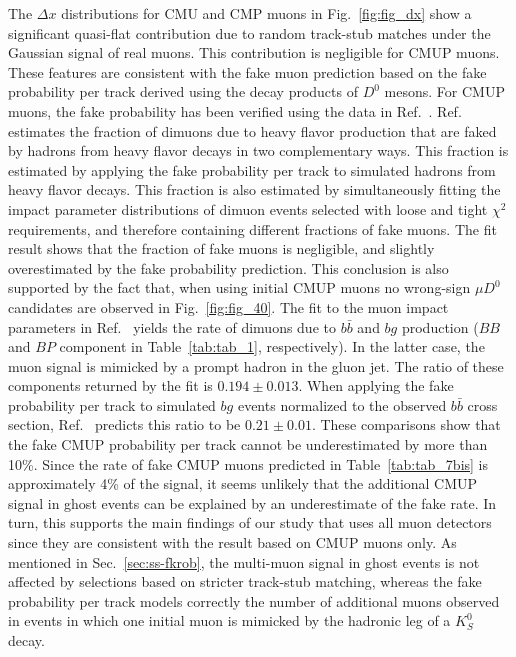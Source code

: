 \documentclass[aps,prd,preprint,floatfix,nofootinbib,superscriptaddress,showpacs,amssymb]{revtex4}
\begin{document}
 The $\Delta x$ distributions for CMU and CMP muons in 
 Fig.~\ref{fig:fig_dx} show a significant quasi-flat contribution due
 to random track-stub matches under the Gaussian signal of real muons.
 This contribution is negligible for CMUP muons. These features are
 consistent with the fake muon prediction based on the fake probability
 per track derived using the decay products of $D^0$ mesons. For CMUP muons,
 the fake probability has been verified using the data in Ref.~\cite{bbxs}. 
 Ref.~\cite{bbxs} estimates the fraction of dimuons due to heavy flavor
 production that are faked by hadrons from heavy flavor decays in two
 complementary ways. This fraction is estimated by applying the fake
 probability per track to simulated hadrons from heavy flavor decays. 
 This fraction is also estimated by simultaneously fitting the impact
 parameter distributions of dimuon events selected with loose and tight
 $\chi^2$ requirements, and therefore containing different fractions of
 fake muons. The fit result shows that the fraction of fake muons is
 negligible, and slightly overestimated by the fake probability prediction.
 This conclusion is also supported by the fact that, when using initial
 CMUP muons no wrong-sign $\mu D^0$ candidates are observed in
 Fig.~\ref{fig:fig_40}. The fit to the muon impact parameters in
 Ref.~\cite{bbxs} yields the rate of dimuons due to $b\bar{b}$ and
 $b g$ production ($BB$ and $BP$ component in Table~\ref{tab:tab_1},
 respectively). In the latter case, the muon signal is mimicked by a
 prompt hadron in the gluon jet. The ratio of these components returned
 by the fit is $0.194 \pm 0.013$. When applying the fake probability per
 track to simulated $b g$ events normalized to the observed $b \bar{b}$ 
 cross section, Ref.~\cite{bbxs} predicts this ratio to be $0.21 \pm 0.01$.
 These comparisons show that the fake CMUP probability per track cannot be
 underestimated by more than 10\%. Since the rate of fake CMUP muons
 predicted in Table~\ref{tab:tab_7bis} is approximately 4\% of the signal,
 it seems unlikely that the additional CMUP signal in ghost events can be
 explained by an underestimate of the fake rate. In turn, this supports
 the main findings of our study that uses all muon detectors since they
 are consistent with the result based on CMUP muons only. As mentioned
 in Sec.~\ref{sec:ss-fkrob}, the multi-muon signal in ghost events is not
 affected by selections based on stricter track-stub matching, whereas the
 fake probability per track models correctly the number of additional
 muons observed in events in which one initial muon is mimicked by the
 hadronic leg of a $K^0_S$ decay. 
\end{document}
